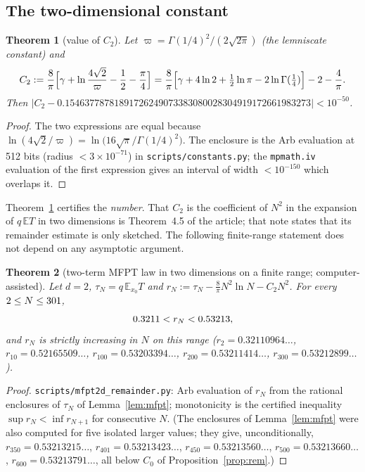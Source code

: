 \documentclass[11pt,a4paper]{article}
\newtheorem{theorem}{Theorem}
\theoremstyle{definition}
\theoremstyle{remark}
\begin{document}
\subsection{The two-dimensional constant}

\begin{theorem}[value of $C_2$]\label{thm:C2}
Let $\varpi=\Gamma(1/4)^2/(2\sqrt{2\pi})$ (the lemniscate constant) and
\[
C_2:=\frac8\pi\Bigl[\gamma+\ln\frac{4\sqrt2}{\varpi}-\frac12-\frac\pi4\Bigr]
=\frac8\pi\Bigl[\gamma+4\ln2+\tfrac12\ln\pi-2\ln\Gamma(\tfrac14)\Bigr]-2-\frac4\pi .
\]
Then $\bigl|C_2-0.15463778781891726249073383080028304919172661983273\bigr|<10^{-50}$.
\end{theorem}
\begin{proof}
The two expressions are equal because $\ln(4\sqrt2/\varpi)=\ln\bigl(16\sqrt\pi/\Gamma(1/4)^2\bigr)$. The enclosure is the Arb evaluation at 512 bits (radius $<3\times10^{-71}$) in \texttt{scripts/constants.py}; the \texttt{mpmath.iv} evaluation of the first expression gives an interval of width $<10^{-150}$ which overlaps it.
\end{proof}

Theorem~\ref{thm:C2} certifies the \emph{number}. That $C_2$ is the coefficient of $N^2$ in the expansion of $q\,\mathbb E T$ in two dimensions is Theorem~4.5 of the article; that note states that its remainder estimate is only sketched. The following finite-range statement does not depend on any asymptotic argument.

\begin{theorem}[two-term MFPT law in two dimensions on a finite range; computer-assisted]\label{thm:rem}
Let $d=2$, $\tau_N=q\,\mathbb E_{x_0}T$ and $r_N:=\tau_N-\frac8\pi N^2\ln N-C_2N^2$. For every $2\le N\le301$,
\[
0.3211<r_N<0.53213,
\]
and $r_N$ is strictly increasing in $N$ on this range ($r_2=0.32110964\ldots$, $r_{10}=0.52165509\ldots$, $r_{100}=0.53203394\ldots$, $r_{200}=0.53211414\ldots$, $r_{300}=0.53212899\ldots$).
\end{theorem}
\begin{proof}
\texttt{scripts/mfpt2d\_remainder.py}: Arb evaluation of $r_N$ from the rational enclosures of $\tau_N$ of Lemma~\ref{lem:mfpt}; monotonicity is the certified inequality $\sup r_N<\inf r_{N+1}$ for consecutive $N$. (The enclosures of Lemma~\ref{lem:mfpt} were also computed for five isolated larger values; they give, unconditionally, $r_{350}=0.53213215\ldots$, $r_{401}=0.53213423\ldots$, $r_{450}=0.53213560\ldots$, $r_{500}=0.53213660\ldots$, $r_{600}=0.53213791\ldots$, all below $C_0$ of Proposition~\ref{prop:rem}.)
\end{proof}
\end{document}
